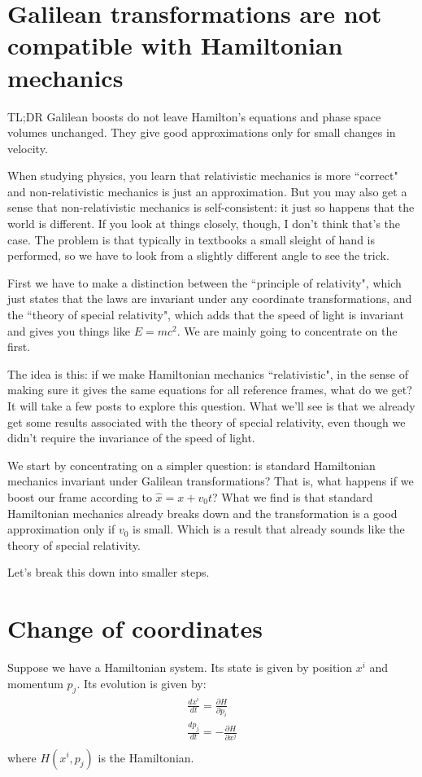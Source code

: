 \documentclass[aps,pra,10pt,floatfix,nofootinbib]{revtex4-1}
\theoremstyle{definition}
\begin{document}
\section{Galilean transformations are not compatible with Hamiltonian mechanics}

TL;DR Galilean boosts do not leave Hamilton's equations and phase space volumes unchanged. They give good approximations only for small changes in velocity.

When studying physics, you learn that relativistic mechanics is more ``correct" and non-relativistic mechanics is just an approximation. But you may also get a sense that non-relativistic mechanics is self-consistent: it just so happens that the world is different. If you look at things closely, though, I don't think that's the case. The problem is that typically in textbooks a small sleight of hand is performed, so we have to look from a slightly different angle to see the trick.

First we have to make a distinction between the ``principle of relativity", which just states that the laws are invariant under any coordinate transformations, and the ``theory of special relativity", which adds that the speed of light is invariant and gives you things like $E=mc^2$. We are mainly going to concentrate on the first.

The idea is this: if we make Hamiltonian mechanics ``relativistic", in the sense of making sure it gives the same equations for all reference frames, what do we get? It will take a few posts to explore this question. What we'll see is that we already get some results associated with the theory of special relativity, even though we didn't require the invariance of the speed of light.

We start by concentrating on a simpler question: is standard Hamiltonian mechanics invariant under Galilean transformations? That is, what happens if we boost our frame according to $\hat{x}=x+ v_0 t$? What we find is that standard Hamiltonian mechanics already breaks down and the transformation is a good approximation only if $v_0$ is small. Which is a result that already sounds like the theory of special relativity.

Let's break this down into smaller steps.

\section{Change of coordinates}

Suppose we have a Hamiltonian system. Its state is given by position $x^i$ and momentum $p_j$. Its evolution is given by:
\begin{equation}
\begin{aligned}
\frac{dx^i}{dt} = \frac{\partial H}{\partial p_i}  \\
\frac{dp_j}{dt} = - \frac{\partial H}{\partial x^j}  \\
\end{aligned}
\label{Hamilton}
\end{equation}
where $H(x^i,p_j)$ is the Hamiltonian.
\end{document}
